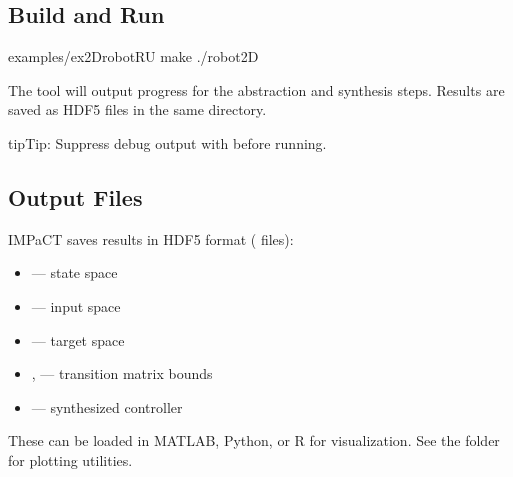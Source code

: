 \documentclass[a4paper,10pt,english]{sphinxmanual}
\begin{document}
\subsection{Build and Run}
\label{\detokenize{getting-started/quickstart:build-and-run}}
\begin{sphinxVerbatim}[commandchars=\\\{\}]
examples/ex\PYGZus{}2Drobot\PYGZhy{}R\PYGZhy{}U
make
./robot2D
\end{sphinxVerbatim}

\sphinxAtStartPar
The tool will output progress for the abstraction and synthesis steps. Results are
saved as HDF5 files in the same directory.

\begin{sphinxadmonition}{tip}{Tip:}
\sphinxAtStartPar
Suppress debug output with  before running.
\end{sphinxadmonition}


\subsection{Output Files}
\label{\detokenize{getting-started/quickstart:output-files}}
\sphinxAtStartPar
IMPaCT saves results in HDF5 format ( files):
\begin{itemize}
\item {} 
\sphinxAtStartPar
{} — state space

\item {} 
\sphinxAtStartPar
{} — input space

\item {} 
\sphinxAtStartPar
{} — target space

\item {} 
\sphinxAtStartPar
{},  — transition matrix bounds

\item {} 
\sphinxAtStartPar
{} — synthesized controller

\end{itemize}

\sphinxAtStartPar
These can be loaded in MATLAB, Python, or R for visualization.
See the  folder for plotting utilities.
\end{document}
